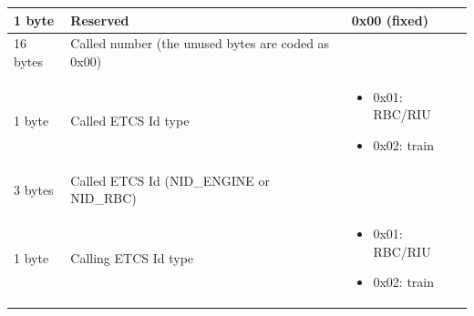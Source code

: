 \documentclass[nocc]{template/openetcs_report}
\begin{document}
\begin{longtable}{|l|l|l|}
				\hline
					\begin{minipage}[t]{0.1\linewidth}1 byte \end{minipage}
					&\begin{minipage}[t]{0.6\linewidth} Reserved	\end{minipage}
					&\begin{minipage}[t]{0.3\linewidth}0x00 (fixed) \end{minipage} \\
				
				\hline
					\begin{minipage}[t]{0.1\linewidth}16 bytes \end{minipage}
					&\begin{minipage}[t]{0.6\linewidth} Called number (the unused bytes are coded as 0x00)	\end{minipage}
					&\begin{minipage}[t]{0.3\linewidth} \end{minipage} \\
				
				\hline
					\begin{minipage}[t]{0.1\linewidth}1 byte \end{minipage}
					&\begin{minipage}[t]{0.6\linewidth} Called ETCS Id type	\end{minipage}
					&\begin{minipage}[t]{0.3\linewidth}
						\begin{itemize}
							\item 0x01: RBC/RIU
							\item 0x02: train
						\end{itemize}
					\end{minipage} \\
				
				\hline
					\begin{minipage}[t]{0.1\linewidth}3 bytes \end{minipage}
					&\begin{minipage}[t]{0.6\linewidth} Called ETCS Id (NID\_ENGINE or NID\_RBC)	\end{minipage}
					&\begin{minipage}[t]{0.3\linewidth} \end{minipage} \\
				
				\hline
					\begin{minipage}[t]{0.1\linewidth}1 byte \end{minipage}
					&\begin{minipage}[t]{0.6\linewidth} Calling ETCS Id type\end{minipage}
					&\begin{minipage}[t]{0.3\linewidth}
						\begin{itemize}
							\item 0x01: RBC/RIU
							\item 0x02: train
						\end{itemize}
					\end{minipage} \\
				

\end{longtable}
\end{document}
